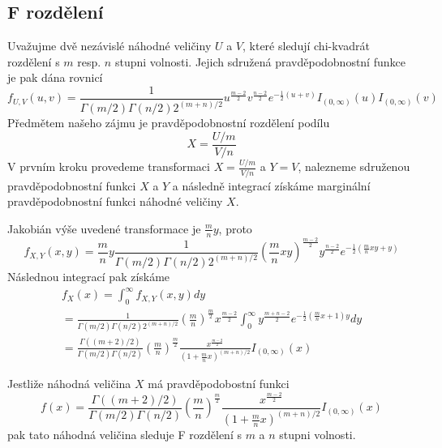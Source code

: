 \subsection{F rozdělení}

Uvažujme dvě nezávislé náhodné veličiny $U$ a $V$, které sledují chi-kvadrát rozdělení s $m$ resp. $n$ stupni volnosti. Jejich sdružená pravděpodobnostní funkce je pak dána rovnicí
\begin{equation*}
f_{U,V}(u,v) = \frac{1}{\Gamma(m/2)\Gamma(n/2)2^{(m + n)/2}}u^{\frac{m-2}{2}}v^{\frac{n - 2}{2}}e^{-\frac{1}{2}(u + v)}I_{(0, \infty)}(u)I_{(0, \infty)}(v)
\end{equation*}
Předmětem našeho zájmu je pravděpodobnostní rozdělení podílu
\begin{equation*}
X = \frac{U/m}{V/n}
\end{equation*}
V prvním kroku provedeme transformaci $X = \frac{U/m}{V/n}$ a $Y = V$, nalezneme sdruženou pravděpodobnostní funkci $X$ a $Y$ a následně integrací získáme marginální pravděpodobnostní funkci náhodné veličiny $X$.

Jakobián výše uvedené transformace je $\frac{m}{n}y$, proto
\begin{equation*}
f_{X,Y}(x,y) = \frac{m}{n}y \frac{1}{\Gamma(m/2)\Gamma(n/2)2^{(m + n)/2}}\left(\frac{m}{n}xy\right)^{\frac{m-2}{2}}y^{\frac{n - 2}{2}}e^{-\frac{1}{2}\left(\frac{m}{n}xy + y \right)}
\end{equation*}
Následnou integrací pak získáme
\begin{gather*}
f_X(x) = \int_0^{\infty} f_{X,Y}(x,y)dy\\
= \frac{1}{\Gamma(m/2)\Gamma(n/2)2^{(m + n)/2}}\left(\frac{m}{n}\right)^{\frac{m}{2}}x^{\frac{m - 2}{2}} \int_0^{\infty} y^{\frac{m + n - 2}{2}}e^{-\frac{1}{2}\left(\frac{m}{n}x + 1 \right)y}dy\\
= \frac{\Gamma((m+2)/2)}{\Gamma(m/2)\Gamma(n/2)}\left(\frac{m}{n}\right)^{\frac{m}{2}}\frac{x^{\frac{m-2}{2}}}{\left(1 + \frac{m}{n}x \right)^{(m + n)/2}}I_{(0, \infty)}(x)
\end{gather*}

\begin{definition}[F rozdělení]
Jestliže náhodná veličina $X$ má pravděpodobostní funkci
\begin{equation*}
f(x) = \frac{\Gamma((m+2)/2)}{\Gamma(m/2)\Gamma(n/2)}\left(\frac{m}{n}\right)^{\frac{m}{2}}\frac{x^{\frac{m-2}{2}}}{\left(1 + \frac{m}{n}x \right)^{(m + n)/2}}I_{(0, \infty)}(x)
\end{equation*}
pak tato náhodná veličina sleduje F rozdělení s $m$ a $n$ stupni volnosti.
\end{definition}

